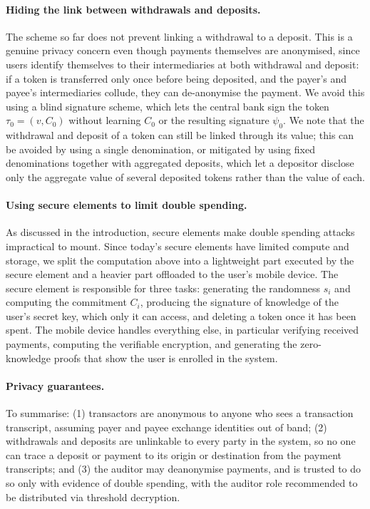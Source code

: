 \paragraph{Hiding the link between withdrawals and deposits.} The scheme so far
does not prevent linking a withdrawal to a deposit. This is a genuine privacy
concern even though payments themselves are anonymised, since users identify
themselves to their intermediaries at both withdrawal and deposit: if a token
is transferred only once before being deposited, and the payer's and payee's
intermediaries collude, they can de-anonymise the payment. We avoid this using
a blind signature scheme, which lets the central bank sign the token $\tau_0 =
(v, C_0)$ without learning $C_0$ or the resulting signature $\psi_0$. We note
that the withdrawal and deposit of a token can still be linked through its
value; this can be avoided by using a single denomination, or mitigated by
using fixed denominations together with aggregated deposits, which let a
depositor disclose only the aggregate value of several deposited tokens rather
than the value of each.

\paragraph{Using secure elements to limit double spending.} As discussed in the
introduction, secure elements make double spending attacks impractical to
mount. Since today's secure elements have limited compute and storage, we split
the computation above into a lightweight part executed by the secure element
and a heavier part offloaded to the user's mobile device.  The secure element
is responsible for three tasks: generating the randomness $s_i$ and computing
the commitment $C_i$, producing the signature of knowledge of the user's secret
key, which only it can access, and deleting a token once it has been spent. The
mobile device handles everything else, in particular verifying received
payments, computing the verifiable encryption, and generating the
zero-knowledge proofs that show the user is enrolled in the system.

\paragraph{Privacy guarantees.} To summarise: (1) transactors are anonymous to
anyone who sees a transaction transcript, assuming payer and payee exchange
identities out of band; (2) withdrawals and deposits are unlinkable to every
party in the system, so no one can trace a deposit or payment to its origin or
destination from the payment transcripts; and (3) the auditor may deanonymise
payments, and is trusted to do so only with evidence of double spending, with
the auditor role recommended to be distributed via threshold decryption.

